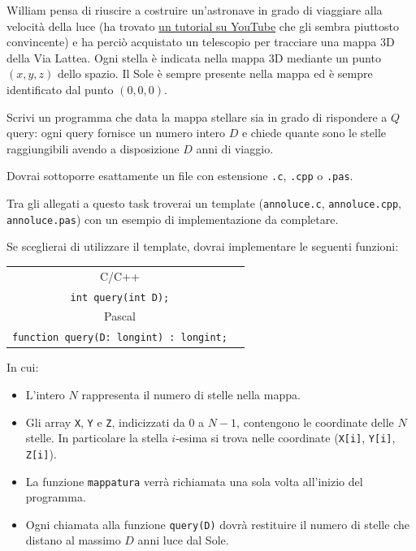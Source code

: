   William pensa di riuscire a costruire un'astronave in grado di viaggiare alla velocità della luce (ha trovato \href{https://www.youtube.com/watch?v=dQw4w9WgXcQ}{un tutorial su YouTube} che gli sembra piuttosto convincente) e ha perciò acquistato un telescopio per tracciare una mappa 3D della Via Lattea. Ogni stella è indicata nella mappa 3D mediante un punto $(x, y, z)$ dello spazio. Il Sole è sempre presente nella mappa ed è sempre identificato dal punto $(0, 0, 0)$.

  Scrivi un programma che data la mappa stellare sia in grado di rispondere a $Q$ query: ogni query fornisce un numero intero $D$ e chiede quante sono le stelle raggiungibili avendo a disposizione $D$ anni di viaggio.

\Implementation
Dovrai sottoporre esattamente un file con estensione \texttt{.c}, \texttt{.cpp} o \texttt{.pas}.

\begin{warning}
Tra gli allegati a questo task troverai un template (\texttt{annoluce.c}, \texttt{annoluce.cpp}, \texttt{annoluce.pas}) con un esempio di implementazione da completare.
\end{warning}

Se sceglierai di utilizzare il template, dovrai implementare le seguenti funzioni:
\begin{center}\begin{tabularx}{\textwidth}{|c|X|}
\hline
C/C++  & \begin{tabular}[x]{@{}@{}}\verb|void mappatura(int N, int X[], int Y[], int Z[]);|\\ \verb|int query(int D);|\end{tabular}\\
\hline
Pascal & \begin{tabular}[x]{@{}@{}}\verb|procedure mappatura(N: longint; var X, Y, Z: array of longint);|\\ \verb|function query(D: longint) : longint;|\end{tabular}\\
\hline
\end{tabularx}\end{center}
In cui:
\begin{itemize}[nolistsep]
  \item L'intero $N$ rappresenta il numero di stelle nella mappa.
  \item Gli array \texttt{X}, \texttt{Y} e \texttt{Z}, indicizzati da $0$ a $N-1$, contengono le coordinate delle $N$ stelle. In particolare la stella $i$-esima si trova nelle coordinate (\texttt{X[i]}, \texttt{Y[i]}, \texttt{Z[i]}).
  \item La funzione \texttt{mappatura} verrà richiamata una sola volta all'inizio del programma.
  \item Ogni chiamata alla funzione \texttt{query(D)} dovrà restituire il numero di stelle che distano al massimo $D$ anni luce dal Sole.
\end{itemize}

